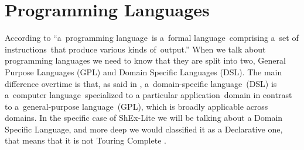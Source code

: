 \section{Programming Languages}
According to  “a programming language is a formal language comprising a set of instructions that produce various kinds of output.” When we talk about programming languages we need to know that they are split into two, General Purpose Languages (GPL) and Domain Specific Languages (DSL). The main difference overtime is that, as said in , a domain-specific language (DSL) is a computer language specialized to a particular application domain in contrast to a general-purpose language (GPL), which is broadly applicable across domains.
In the specific case of ShEx-Lite we will be talking about a Domain Specific Language, and more deep we would classified it as a Declarative one, that means that it is not Touring Complete .
